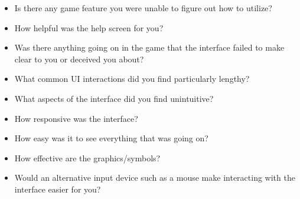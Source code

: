 \documentclass[12pt, titlepage]{article}
\begin{document}
	\begin{itemize}
		\item Is there any game feature you were unable to figure out how to utilize?
		\item How helpful was the help screen for you?
		\item Was there anything going on in the game that the interface failed to make clear to you or deceived you about?
		\item What common UI interactions did you find particularly lengthy?
		\item What aspects of the interface did you find unintuitive?
		\item How responsive was the interface?
		\item How easy was it to see everything that was going on?
		\item How effective are the graphics/symbols?
		\item Would an alternative input device such as a mouse make interacting with the interface easier for you?
	\end{itemize}
\end{document}
